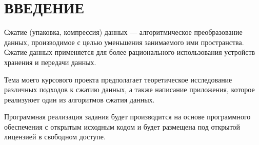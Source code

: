 \section*{ВВЕДЕНИЕ}

Сжатие (упаковка, компрессия) данных --- алгоритмическое преобразование данных,
производимое с целью уменьшения занимаемого ими пространства.
Сжатие данных применяется для более рационального использования 
устройств хранения и передачи данных.

Тема моего курсового проекта предполагает теоретическое 
исследование различных подходов к сжатию данных, а также
написание приложения, которое реализуюет один из алгоритмов сжатия
данных.

Программная реализация задания будет производится на основе программного 
обеспечения с открытым исходным кодом и будет размещена под открытой
лицензией в свободном доступе.